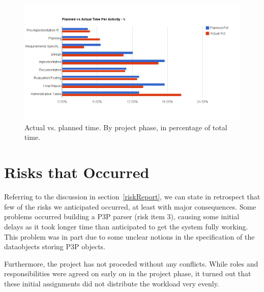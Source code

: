 \begin{centering}
  \begin{figure}[h!]
    \includegraphics[width=\textwidth]{Evaluation/time_per_activity_pct}
    \caption{Actual vs. planned time. By project phase, in percentage of total time.}
    \label{perActivityCUml}
  \end{figure}
\end{centering}

\section{Risks that Occurred}\label{courseEval}

Referring to the discussion in section~\ref{riskReport}, we can state
in retrospect that few of the risks we anticipated occurred, at least
with major consequences. Some problems occurred building a P3P
parser (risk item 3), causing some initial delays as it took longer time than
anticipated to get the system fully working. This problem was in part
due to some unclear notions in the specification of the dataobjects
storing P3P objects.

Furthermore, the project has not proceded without any conflicts. While
roles and responsibilities were agreed on early on in the project
phase, it turned out that these initial assignments did not distribute the
workload very evenly. 

